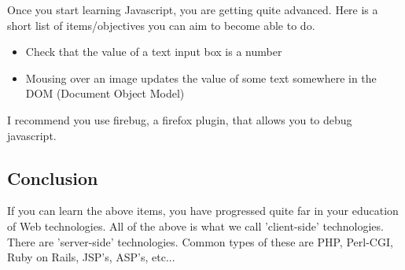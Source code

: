 Once you start learning Javascript, you are getting quite advanced.  Here is a short list of
items/objectives you can aim to become able to do.

\begin{itemize}
\item Check that the value of a text input box is a number
\item Mousing over an image updates the value of some text somewhere in the DOM (Document Object Model)
\end{itemize}

I recommend you use firebug, a firefox plugin, that allows you to debug
javascript.

\subsection{Conclusion}

If you can learn the above items, you have progressed quite far in your education of Web technologies.  All of the above is what we call 'client-side' technologies.  There are 'server-side' technologies.  Common types of these are PHP, Perl-CGI, Ruby on Rails, JSP's, ASP's, etc...







